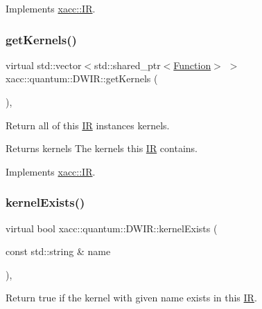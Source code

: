 Implements \hyperlink{a01175_a6f49b4ba4b3a15142b04873284885f0d}{xacc\+::\+IR}.

\mbox{\label{a00979_a66e22c5dc95ec46045476864012ad08f}} 
\subsubsection{\texorpdfstring{get\+Kernels()}{getKernels()}}
{\footnotesize\ttfamily virtual std\+::vector$<$std\+::shared\+\_\+ptr$<$\hyperlink{a01151}{Function}$>$ $>$ xacc\+::quantum\+::\+D\+W\+I\+R\+::get\+Kernels (\begin{DoxyParamCaption}{ }\end{DoxyParamCaption})\hspace{0.3cm}{\ttfamily [inline]}, {\ttfamily [virtual]}}

Return all of this \hyperlink{a01175}{IR} instance\textquotesingle{}s kernels.

\begin{DoxyReturn}{Returns}
kernels The kernels this \hyperlink{a01175}{IR} contains. 
\end{DoxyReturn}


Implements \hyperlink{a01175_a88c50bfc5b279145360ddc0c3a703b9b}{xacc\+::\+IR}.

\mbox{\label{a00979_ab5e8861d3bc0845bb015af6208f5f396}} 
\subsubsection{\texorpdfstring{kernel\+Exists()}{kernelExists()}}
{\footnotesize\ttfamily virtual bool xacc\+::quantum\+::\+D\+W\+I\+R\+::kernel\+Exists (\begin{DoxyParamCaption}\item[{const std\+::string \&}]{name }\end{DoxyParamCaption})\hspace{0.3cm}{\ttfamily [inline]}, {\ttfamily [virtual]}}

Return true if the kernel with given name exists in this \hyperlink{a01175}{IR}.


